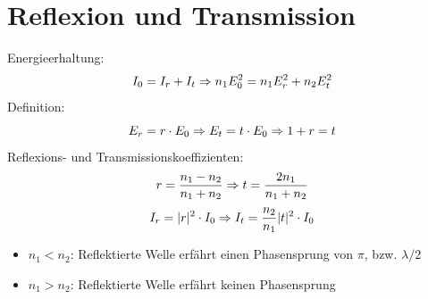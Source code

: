 \section{Reflexion und Transmission}
Energieerhaltung:
\[
	I_0=I_r+I_t \\ \Rightarrow \\ n_1 E_0^2= n_1 E_r^2+ n_2 E_t^2 \\ \\
\]
Definition:	
\[
	E_r=r\cdot E_0 \\ \Rightarrow \\ E_t=t\cdot E_0 \\
	\Rightarrow \\ 1+r=t\\
\]
Reflexions- und Transmissionskoeffizienten:
\[
	r= \frac{n_1-n_2}{n_1+n_2} \\ \Rightarrow \\ 
	t= \frac{2n_1}{n_1+n_2} 	\\ \\ \\
\]
\[
	I_r=|r|^2\cdot I_0  \\ \Rightarrow \\ 
	I_t=\frac{n_2}{n_1}|t|^2\cdot I_0 \\ \\
\]
\begin{itemize}
	\item $n_1 < n_2$: Reflektierte Welle erfährt einen Phasensprung von $\pi$, bzw. $\lambda/2$
	\item$n_1 > n_2$: Reflektierte Welle erfährt keinen Phasensprung \\
\end{itemize}
\
